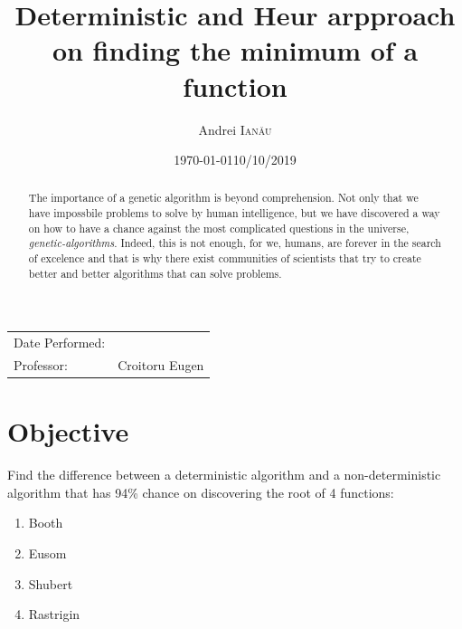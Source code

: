 \documentclass{article}
\title{Deterministic and Heur arpproach \\ on finding the minimum of a function} %
\author{Andrei \textsc{Ianău}} %
\date{\today} %
\begin{document}
\maketitle %

\begin{center}
\begin{tabular}{l r}
Date Performed: & \date{10/10/2019} \\ %
Professor: & Croitoru Eugen %
\end{tabular}
\end{center}



\begin{abstract}

The importance of a genetic algorithm is beyond comprehension. Not only that we have impossbile problems to solve by human intelligence, but we have discovered a way on how to have a chance against the most complicated questions in the universe, \emph{genetic-algorithms}. 
Indeed, this is not enough, for we, humans, are forever in the search of excelence and that is why there exist communities of scientists that try to create better and better algorithms that can solve problems.

\end{abstract}


\section{Objective}

Find the difference between a deterministic algorithm and a non-deterministic algorithm that has 94\% chance on discovering the root of 4 functions:
\begin{enumerate}
	\item Booth
	\item Eusom
	\item Shubert
	\item Rastrigin
\end{enumerate}
\end{document}
